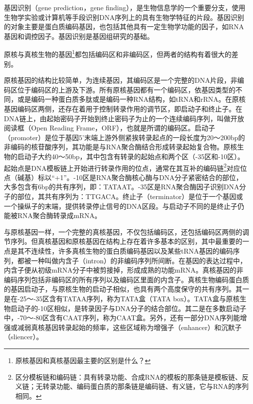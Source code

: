 \documentclass[11pt,a4paper,twoside]{book}
\begin{document}
基因识别（gene prediction，gene finding），是生物信息学的一个重要分支，使用生物学实验或计算机等手段识别DNA序列上的具有生物学特征的片段。基因识别的对象主要是蛋白质编码基因，也包括其他具有一定生物学功能的因子，如RNA基因和调控因子。基因识别是基因组研究的基础。

\noindent
{}

原核与真核生物的基因\footnote{原核基因和真核基因最主要的区别是什么？}都包括编码区和非编码区，但两者的结构有着很大的差别。

原核基因的结构比较简单，为连续基因，其编码区是一个完整的DNA片段，非编码区位于编码区的上游及下游。所有原核基因都有一个编码区，依基因类型的不同，或是编码一种蛋白质多肽或是编码一种RNA结构，如tRNA和rRNA。在原核基因编码区两侧，还存在着用于控制转录作用的调节区，即启动子和终止子。在DNA链上，由起始密码子开始到终止密码子为止的一个连续编码序列，叫做开放阅读框（Open Reading Frame，ORF），也就是所谓的编码区。启动子（promoter）是位于基因5'末端上游外侧紧挨转录起点的一段长度为20～200bp的非编码的核苷酸序列，其功能是与RNA聚合酶结合形成转录起始复合物。原核生物的启动子大约40～50bp，其中包含有转录的起始点和两个区（-35区和-10区）。起始点是DNA模板链上开始进行转录作用的位点，通常在其互补的编码链\footnote{区分模板链和编码链：具有转录功能、合成RNA的模板的那条链是模板链、反义链；无转录功能、编码蛋白质的那条链是编码链、有义链，它与RNA的序列相同。}对应位点（碱基）标以“+1”。-10区是RNA聚合酶核心酶与DNA分子紧密结合的部位，大多包含有6bp的共有序列，即：TATAAT。-35区是RNA聚合酶因子识别DNA分子的部位，其共有序列为：TTGACA。终止子（terminator）是位于一个基因或一个操纵子的末端，提供转录停止信号的DNA区段。与启动子不同的是终止子仍能被RNA聚合酶转录成mRNA。

与原核基因一样，一个完整的真核基因，不仅包括编码区，还包括编码区两侧的调节序列。但真核基因和原核基因在结构上存在着许多基本的区别，其中最重要的一点是其不连续性，许多真核生物的蛋白质编码基因以及某些tRNA基因的编码序列，都被一种叫做内含子（intron）的非编码序列所间断。在基因的表达过程中，内含子便从初级mRNA分子中被剪接掉，形成成熟的功能mRNA。真核基因的非编码序列包括非编码区的所有序列以及编码区里面的内含子。真核生物编码蛋白质的基因启动子，与原核生物的启动子相似，也具有两个高度保守的共有序列。其一是在-25～-35区含有TATAA序列，称为TATA盒（TATA box）。TATA盒与原核生物启动子的-10区相似，是转录因子与DNA分子的结合部位。其二是在多数启动子中，-70～-80区含有CAAT序列，称为CAAT盒。另外，还有一部分DNA序列能增强或减弱真核基因转录起始的频率，这些区域称为增强子（enhancer）和沉默子（sliencer）。
\end{document}
